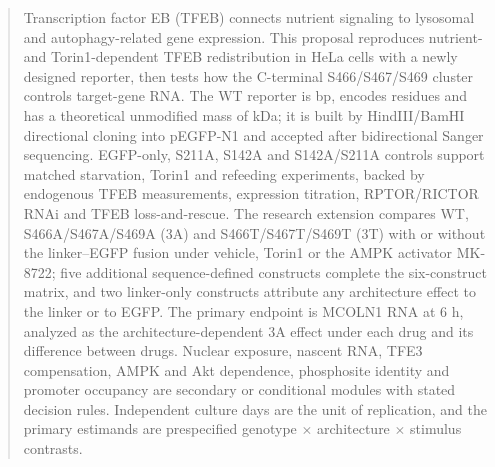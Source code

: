 \begin{abstract}
Transcription factor EB (TFEB) connects nutrient signaling to lysosomal and autophagy-related gene expression. This proposal reproduces nutrient- and Torin1-dependent TFEB redistribution in HeLa cells with a newly designed reporter, then tests how the C-terminal S466/S467/S469 cluster controls target-gene RNA. The WT reporter is \ConstructBp{} bp, encodes \FusionAa{} residues and has a theoretical unmodified mass of \FusionMassKDa{} kDa; it is built by HindIII/BamHI directional cloning into pEGFP-N1 and accepted after bidirectional Sanger sequencing. EGFP-only, S211A, S142A and S142A/S211A controls support matched starvation, Torin1 and refeeding experiments, backed by endogenous TFEB measurements, expression titration, RPTOR/RICTOR RNAi and TFEB loss-and-rescue. The research extension compares WT, S466A/S467A/S469A (3A) and S466T/S467T/S469T (3T) with or without the linker--EGFP fusion under vehicle, Torin1 or the AMPK activator MK-8722; five additional sequence-defined constructs complete the six-construct matrix, and two linker-only constructs attribute any architecture effect to the linker or to EGFP. The primary endpoint is MCOLN1 RNA at 6 h, analyzed as the architecture-dependent 3A effect under each drug and its difference between drugs. Nuclear exposure, nascent RNA, TFE3 compensation, AMPK and Akt dependence, phosphosite identity and promoter occupancy are secondary or conditional modules with stated decision rules. Independent culture days are the unit of replication, and the primary estimands are prespecified genotype $\times$ architecture $\times$ stimulus contrasts.
\end{abstract}
